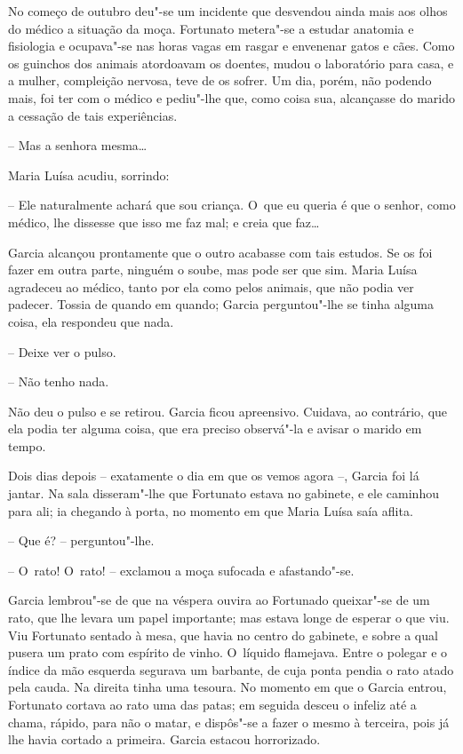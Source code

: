 No começo de outubro deu"-se um incidente que desvendou ainda mais aos
olhos do médico a situação da moça. Fortunato metera"-se a estudar
anatomia e fisiologia e ocupava"-se nas horas vagas em rasgar e envenenar
gatos e cães. Como os guinchos dos animais atordoavam os doentes, mudou
o laboratório para casa, e a mulher, compleição nervosa, teve de os
sofrer. Um dia, porém, não podendo mais, foi ter com o médico e
pediu"-lhe que, como coisa sua, alcançasse do marido a cessação de tais
experiências.

-- Mas a senhora mesma\ldots{}

Maria Luísa acudiu, sorrindo:

-- Ele naturalmente achará que sou criança. O~que eu queria é que o
senhor, como médico, lhe dissesse que isso me faz mal; e creia que
faz\ldots{}

Garcia alcançou prontamente que o outro acabasse com tais estudos. Se os
foi fazer em outra parte, ninguém o soube, mas pode ser que sim. Maria
Luísa agradeceu ao médico, tanto por ela como pelos animais, que não
podia ver padecer. Tossia de quando em quando; Garcia perguntou"-lhe se
tinha alguma coisa, ela respondeu que nada.

-- Deixe ver o pulso.

-- Não tenho nada.

Não deu o pulso e se retirou. Garcia ficou apreensivo. Cuidava, ao
contrário, que ela podia ter alguma coisa, que era preciso observá"-la e
avisar o marido em tempo.

Dois dias depois -- exatamente o dia em que os vemos agora --, Garcia
foi lá jantar. Na sala disseram"-lhe que Fortunato estava no gabinete, e
ele caminhou para ali; ia chegando à porta, no momento em que Maria
Luísa saía aflita.

-- Que é? -- perguntou"-lhe.

-- O~rato! O~rato! -- exclamou a moça sufocada e afastando"-se.

Garcia lembrou"-se de que na véspera ouvira ao Fortunado queixar"-se de um
rato, que lhe levara um papel importante; mas estava longe de esperar o
que viu. Viu Fortunato sentado à mesa, que havia no centro do gabinete,
e sobre a qual pusera um prato com espírito de vinho. O~líquido
flamejava. Entre o polegar e o índice da mão esquerda segurava um
barbante, de cuja ponta pendia o rato atado pela cauda. Na direita tinha
uma tesoura. No momento em que o Garcia entrou, Fortunato cortava ao
rato uma das patas; em seguida desceu o infeliz até a chama, rápido,
para não o matar, e dispôs"-se a fazer o mesmo à terceira, pois já lhe
havia cortado a primeira. Garcia estacou horrorizado.

